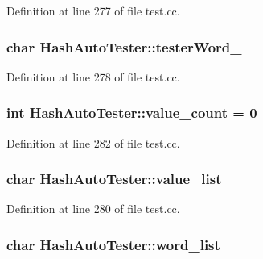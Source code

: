 Definition at line 277 of file test.cc.

\hypertarget{class_hash_auto_tester_a40971169bef9fb9ff71aebf085df0887}{
\subsubsection[{testerWord\_\-}]{\setlength{\rightskip}{0pt plus 5cm}char {\bf HashAutoTester::testerWord\_\-}}}
\label{class_hash_auto_tester_a40971169bef9fb9ff71aebf085df0887}


Definition at line 278 of file test.cc.

\hypertarget{class_hash_auto_tester_a199d2ba715b72cda4e2b7342b4eb43d5}{
\subsubsection[{value\_\-count}]{\setlength{\rightskip}{0pt plus 5cm}int {\bf HashAutoTester::value\_\-count} = 0}}
\label{class_hash_auto_tester_a199d2ba715b72cda4e2b7342b4eb43d5}


Definition at line 282 of file test.cc.

\hypertarget{class_hash_auto_tester_a6e8f47420c983f91a55aaa802238d6dd}{
\subsubsection[{value\_\-list}]{\setlength{\rightskip}{0pt plus 5cm}char {\bf HashAutoTester::value\_\-list}}}
\label{class_hash_auto_tester_a6e8f47420c983f91a55aaa802238d6dd}


Definition at line 280 of file test.cc.

\hypertarget{class_hash_auto_tester_acdcaf3007c079d2a487d7f563e242f6f}{
\subsubsection[{word\_\-list}]{\setlength{\rightskip}{0pt plus 5cm}char {\bf HashAutoTester::word\_\-list}}}
\label{class_hash_auto_tester_acdcaf3007c079d2a487d7f563e242f6f}


